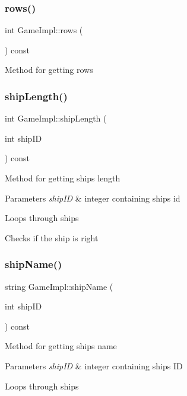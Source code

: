 \subsubsection{\texorpdfstring{rows()}{rows()}}
{\footnotesize\ttfamily int Game\+Impl\+::rows (\begin{DoxyParamCaption}{ }\end{DoxyParamCaption}) const}

Method for getting rows \mbox{\label{class_game_impl_aa3b7b99102e9bcb3c9d06a1d3c672dc0}} 
\subsubsection{\texorpdfstring{ship\+Length()}{shipLength()}}
{\footnotesize\ttfamily int Game\+Impl\+::ship\+Length (\begin{DoxyParamCaption}\item[{int}]{ship\+ID }\end{DoxyParamCaption}) const}

Method for getting ship\textquotesingle{}s length 
\begin{DoxyParams}{Parameters}
{\em ship\+ID} & integer containing ship\textquotesingle{}s id \\
\hline
\end{DoxyParams}
Loops through ships

Checks if the ship is right \mbox{\label{class_game_impl_ad39261b5f7198a6bacf99188e1108a50}} 
\subsubsection{\texorpdfstring{ship\+Name()}{shipName()}}
{\footnotesize\ttfamily string Game\+Impl\+::ship\+Name (\begin{DoxyParamCaption}\item[{int}]{ship\+ID }\end{DoxyParamCaption}) const}

Method for getting ship\textquotesingle{}s name 
\begin{DoxyParams}{Parameters}
{\em ship\+ID} & integer containing ship\textquotesingle{}s ID \\
\hline
\end{DoxyParams}
Loops through ships

